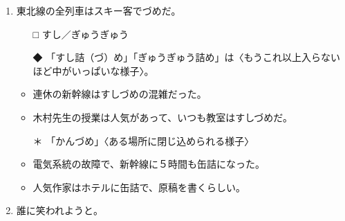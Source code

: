 \documentclass[
uplatex,
b5paper,
10pt,
dvipdfmx
]{jsbook}
\begin{document}
\begin{enumerate}
\item 東北線の全列車はスキー客で\underline{\hspace{3zw}}づめだ。
\begin{itemize}
\item[□] すし／ぎゅうぎゅう
\item[◆] 「すし詰（づ）め」「ぎゅうぎゅう詰め」は〈もうこれ以上入らない
	  ほど中がいっぱいな様子〉。
\end{itemize}
\begin{itemize}
\item 連休の新幹線はすしづめの混雑だった。 
\item 木村先生の授業は人気があって、いつも教室はすしづめだ。 
\end{itemize}
\begin{itemize}
\item[＊] 「かんづめ」〈ある場所に閉じ込められる様子〉
\end{itemize}
\begin{itemize}
\item 電気系統の故障で、新幹線に５時間も缶詰になった。
\item 人気作家はホテルに缶詰で、原稿を書くらしい。 
\end{itemize}

\item 誰に笑われようと\underline{\hspace{3zw}}。


\end{enumerate}
\end{document}
